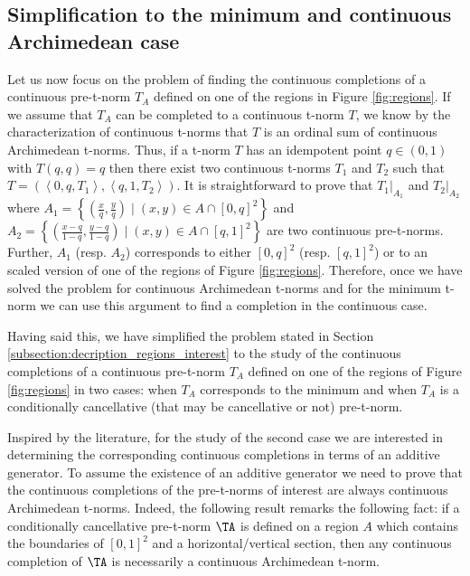 \subsection{Simplification to the minimum and continuous Archimedean case}

Let us now focus on the problem of finding the continuous completions of a continuous pre-t-norm $T_A$ defined on one of the regions in Figure \ref{fig:regions}. If we assume that $T_A$ can be completed to a continuous t-norm $T$, we know by the characterization of continuous t-norms that $T$ is an ordinal sum of continuous Archimedean t-norms. Thus, if a t-norm $T$ has an idempotent point $q \in (0,1)$ with $T(q,q)=q$ then there exist two continuous t-norms $T_1$ and $T_2$ such that $T=(\left\langle 0,q,T_1 \right\rangle, \left\langle q,1,T_2 \right\rangle)$. It is straightforward to prove that $T_1|_{A_1}$ and $T_2|_{A_2}$ where $\displaystyle A_1= \left\lbrace \left(\frac{x}{q},\frac{y}{q}\right) \mid (x,y) \in A \cap [0,q]^2\right\rbrace$ and $A_2 = \left\lbrace \left(\frac{x-q}{1-q},\frac{y-q}{1-q}\right) \mid (x,y) \in A \cap [q,1]^2\right\rbrace$ are two continuous pre-t-norms. Further, $A_1$ (resp. $A_2$)  corresponds to either $[0,q]^2$ (resp. $[q,1]^2$) or to an scaled version of one of the regions of Figure \ref{fig:regions}. Therefore, once we have solved the problem for continuous Archimedean t-norms and for the minimum t-norm we can use this argument to find a completion in the continuous case. 

Having said this, we have simplified the problem stated in Section \ref{subsection:decription_regions_interest} to the study of the continuous completions of a continuous pre-t-norm $T_A$ defined on one of the regions of Figure \ref{fig:regions} in two cases: when $T_A$ corresponds to the minimum and when $T_A$ is a conditionally cancellative (that may be cancellative or not) pre-t-norm.

Inspired by the literature, for the study of the second case we are interested in determining the corresponding continuous completions in terms of an additive generator.  To assume the existence of an additive generator we need to prove that the continuous completions of the pre-t-norms of interest are always continuous Archimedean t-norms. Indeed, the following result remarks the following fact: if a conditionally cancellative pre-t-norm $\TA$ is defined on a region $A$ which contains the boundaries of $[0,1]^2$ and a horizontal/vertical section, then any continuous completion of $\TA$ is necessarily a continuous Archimedean t-norm.

